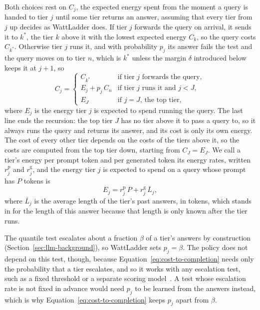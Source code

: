 \documentclass[cic,dipl,english]{infufrgs}
\begin{document}
Both choices rest on $C_j$, the expected energy spent from the moment a query is handed
to tier $j$ until some tier returns an answer, assuming that every tier from $j$ up decides
as WattLadder does. If tier $j$ forwards the query on arrival, it sends it to
$k^*$, the tier $k$ above it with the lowest expected energy $C_k$, so the query costs
$C_{k^*}$. Otherwise tier $j$ runs
it, and with probability $p_j$ its answer fails the test and the query moves on to tier
$n$, which is $k^*$ unless the margin $\delta$ introduced below keeps it at $j+1$, so
\begin{equation}
  C_j =
  \begin{cases}
    C_{k^*} & \text{if tier } j \text{ forwards the query},\\
    E_j + p_j \, C_n & \text{if tier } j \text{ runs it and } j < J,\\
    E_J & \text{if } j = J \text{, the top tier},
  \end{cases}
  \label{eq:cost-to-completion}
\end{equation}
where $E_j$ is the energy tier $j$ is expected to spend running the query. The last line
ends the recursion: the top tier $J$ has no tier above it to pass a query to, so it always
runs the query and returns its answer, and its cost is only its own energy. The cost of
every other tier depends on the costs of the tiers above it, so the costs are computed from
the top tier down, starting from $C_J = E_J$. We call a tier's energy per prompt token and per generated token its energy
rates, written $r^{\text{p}}_j$ and $r^{\text{g}}_j$, and the energy tier $j$ is expected
to spend on a query whose prompt has $P$ tokens is
\begin{equation}
  E_j = r^{\text{p}}_j \, P + r^{\text{g}}_j \, \bar{L}_j,
  \label{eq:expected-energy}
\end{equation}
where $\bar{L}_j$ is the average length of the tier's past answers, in tokens, which stands
in for the length of this answer because that length is only known after the tier runs.

The quantile test escalates about a fraction $\beta$ of a tier's answers by construction
(Section~\ref{sec:llm-background}), so WattLadder sets $p_j = \beta$. The policy does not
depend on this test, though, because Equation~\eqref{eq:cost-to-completion} needs only
the probability that a tier escalates, and so it works with any escalation test, such as
a fixed threshold or a separate scoring model~\cite{chen2024frugalgpt}. A test whose escalation
rate is not fixed in advance would need $p_j$ to be learned from the answers instead, which is
why Equation~\eqref{eq:cost-to-completion} keeps $p_j$ apart from $\beta$.
\end{document}
